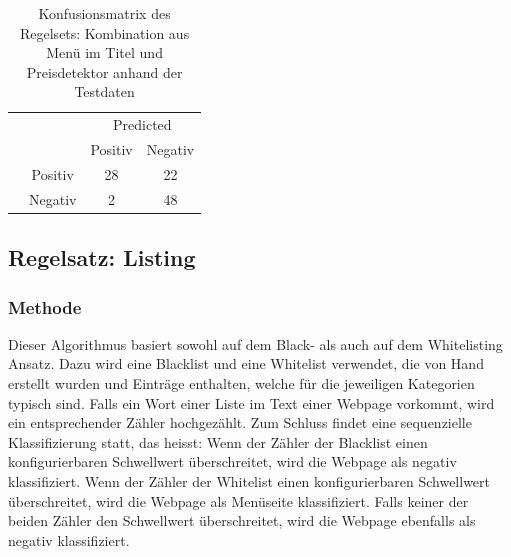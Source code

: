 \begin{table}[H]
	\caption{Konfusionsmatrix des Regelsets: Kombination aus Menü im Titel und Preisdetektor anhand der Testdaten}
	\centering
	\begin{tabular}{@{}cc|cc@{}}
		\multicolumn{1}{c}{} &\multicolumn{1}{c}{} &\multicolumn{2}{c}{Predicted} \\ 
		\multicolumn{1}{c}{} & 
		\multicolumn{1}{c|}{} & 
		\multicolumn{1}{c}{Positiv} & 
		\multicolumn{1}{c}{Negativ} \\ 
		\cline{2-4}
		\multirow[c]{2}{*}{\rotatebox[origin=tr]{90}{Actual}}
		& Positiv  & 28   & 22   \\[1.5ex]
		& Negativ  & 2   & 48 \\ 
		\cline{2-4}
	\end{tabular}
\end{table}
\subsection{Regelsatz: Listing}
\subsubsection{Methode}
Dieser Algorithmus basiert sowohl auf dem Black- als auch auf dem Whitelisting Ansatz.
Dazu wird eine Blacklist und eine Whitelist verwendet, die von Hand erstellt wurden und Einträge enthalten, welche für die jeweiligen Kategorien typisch sind.
Falls ein Wort einer Liste im Text einer Webpage vorkommt, wird ein entsprechender Zähler hochgezählt.
Zum Schluss findet eine sequenzielle Klassifizierung statt, das heisst: 
Wenn der Zähler der Blacklist einen konfigurierbaren Schwellwert überschreitet, wird die Webpage als negativ klassifiziert. 
Wenn der Zähler der Whitelist einen konfigurierbaren Schwellwert überschreitet, wird die Webpage als Menüseite klassifiziert.
Falls keiner der beiden Zähler den Schwellwert überschreitet, wird die Webpage ebenfalls als negativ klassifiziert. 
